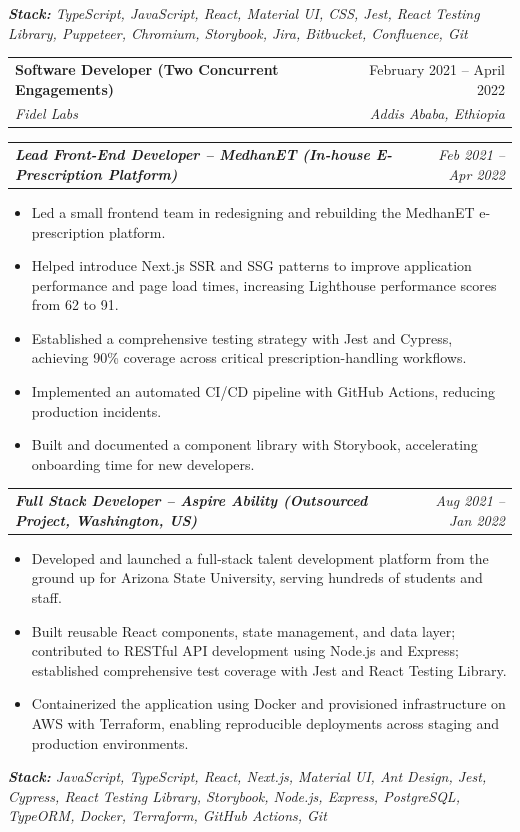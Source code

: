 \documentclass[letterpaper,11pt]{article}
\makeatletter
\newcommand{\resumeItem}[1]{%
  \item \small{#1}
}
\newcommand{\resumeSubheading}[4]{%
  \item
  \begin{tabular*}{\textwidth}[t]
    {l@{\extracolsep{\fill}}r}
    \textbf{#1} & \small #2 \\
    \textit{\small #3} & \textit{\small #4}
  \end{tabular*}
}
\newcommand{\resumeSubRole}[2]{%
  \vspace{4pt}
  \begin{tabular*}{\textwidth}[t]
    {l@{\extracolsep{\fill}}r}
    \textit{\small\textbf{#1}} &
    \textit{\small #2}
  \end{tabular*}
}
\newcommand{\resumeItemListStart}{
  \begin{itemize}[
    leftmargin=18pt,
    itemsep=5pt,
    parsep=2pt,
    topsep=5pt
  ]
}
\newcommand{\resumeItemListEnd}{
  \end{itemize}
}
\makeatother
\begin{document}
  \textit{\small\textbf{Stack:} TypeScript, JavaScript, React, Material UI, CSS, Jest, React
    Testing Library, Puppeteer, Chromium, Storybook, Jira, Bitbucket, Confluence, Git}

  \resumeSubheading
    {Software Developer (Two Concurrent Engagements)}{February 2021 -- April 2022}
    {Fidel Labs}{Addis Ababa, Ethiopia}

  \resumeSubRole
    {Lead Front-End Developer -- MedhanET (In-house E-Prescription Platform)}
    {Feb 2021 -- Apr 2022}

  \resumeItemListStart
    \resumeItem{Led a small frontend team in redesigning and rebuilding the MedhanET e-prescription platform.}

    \resumeItem{Helped introduce Next.js SSR and SSG patterns to improve application performance and page load times, increasing Lighthouse performance scores from 62 to 91.}

    \resumeItem{Established a comprehensive testing strategy with Jest and Cypress, achieving
      90\% coverage across critical prescription-handling workflows.}

    \resumeItem{Implemented an automated CI/CD pipeline with GitHub Actions, reducing production incidents.}

    \resumeItem{Built and documented a component library with Storybook, accelerating onboarding
      time for new developers.}
  \resumeItemListEnd

  \resumeSubRole
    {Full Stack Developer -- Aspire Ability (Outsourced Project, Washington, US)}
    {Aug 2021 -- Jan 2022}

  \resumeItemListStart
    \resumeItem{Developed and launched a full-stack talent development platform from the ground up
      for Arizona State University, serving hundreds of students and staff.}

    \resumeItem{Built reusable React components, state management, and data layer; contributed to
      RESTful API development using Node.js and Express; established comprehensive test coverage
      with Jest and React Testing Library.}

    \resumeItem{Containerized the application using Docker and provisioned infrastructure on AWS
      with Terraform, enabling reproducible deployments across staging and production
      environments.}
  \resumeItemListEnd

  \textit{\small\textbf{Stack:} JavaScript, TypeScript, React, Next.js, Material UI, Ant Design,
    Jest, Cypress, React Testing Library, Storybook, Node.js, Express, PostgreSQL, TypeORM,
    Docker, Terraform, GitHub Actions, Git}
\end{document}
